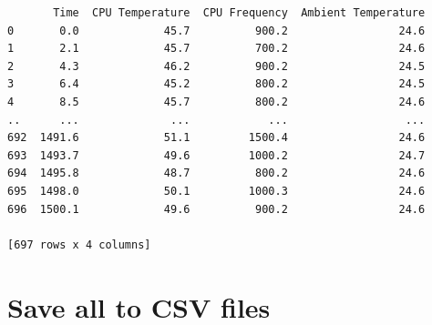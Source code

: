 \documentclass [oneside,10pt,a4paper,ngerman,BCOR10mm,headsepline,parindent,final]{scrartcl}
\begin{document}
    
    \begin{verbatim}
       Time  CPU Temperature  CPU Frequency  Ambient Temperature
0       0.0             45.7          900.2                 24.6
1       2.1             45.7          700.2                 24.6
2       4.3             46.2          900.2                 24.5
3       6.4             45.2          800.2                 24.5
4       8.5             45.7          800.2                 24.6
..      ...              ...            ...                  ...
692  1491.6             51.1         1500.4                 24.6
693  1493.7             49.6         1000.2                 24.7
694  1495.8             48.7          800.2                 24.6
695  1498.0             50.1         1000.3                 24.6
696  1500.1             49.6          900.2                 24.6

[697 rows x 4 columns]
    \end{verbatim}

    
    \hypertarget{save-all-to-csv-files}{%
\section{Save all to CSV files}\label{save-all-to-csv-files}}
\end{document}
